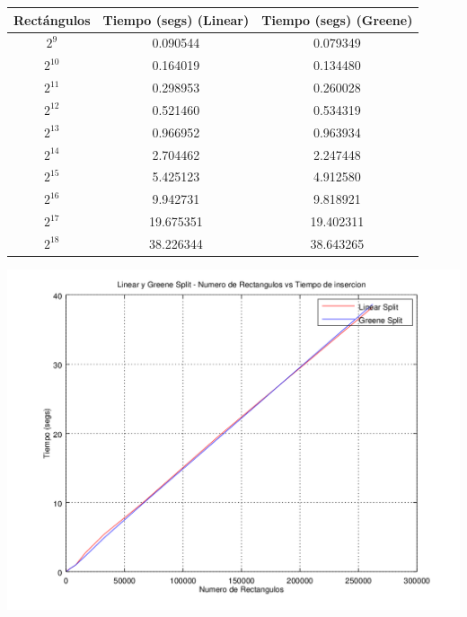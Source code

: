 \documentclass[letterpaper,10pt]{article}
\begin{document}
	\begin{center}

		\begin{tabular}{|c|c||c|}
			\hline
			Rectángulos	& Tiempo (segs) (Linear) & Tiempo (segs) (Greene) \\
			\hline
			$2^{9}$ 	& 0.090544	& 0.079349\\
			\hline
			$2^{10}$ 	& 0.164019	& 0.134480\\
			\hline
			$2^{11}$ 	& 0.298953	& 0.260028\\
			\hline
			$2^{12}$ 	& 0.521460	& 0.534319\\
			\hline
			$2^{13}$ 	& 0.966952	& 0.963934\\
			\hline
			$2^{14}$ 	& 2.704462	& 2.247448\\
			\hline
			$2^{15}$ 	& 5.425123	& 4.912580\\
			\hline
			$2^{16}$ 	& 9.942731	& 9.818921\\
			\hline
			$2^{17}$ 	& 19.675351	& 19.402311\\
			\hline
			$2^{18}$ 	& 38.226344	& 38.643265\\
			\hline
		\end{tabular}

		\includegraphics[width=0.75\textheight]{fig1.png}
	\end{center}

	\newpage
\end{document}
